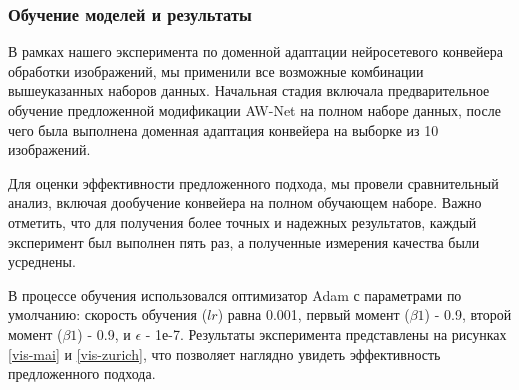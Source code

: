 \subsubsection{Обучение моделей и результаты}\label{sect-2-2-3}

В рамках нашего эксперимента по доменной адаптации нейросетевого конвейера обработки изображений, мы применили все возможные комбинации вышеуказанных наборов данных. Начальная стадия включала предварительное обучение предложенной модификации AW-Net на полном наборе данных, после чего была выполнена доменная адаптация конвейера на выборке из 10 изображений.

Для оценки эффективности предложенного подхода, мы провели сравнительный анализ, включая дообучение конвейера на полном обучающем наборе. Важно отметить, что для получения более точных и надежных результатов, каждый эксперимент был выполнен пять раз, а полученные измерения качества были усреднены.

В процессе обучения использовался оптимизатор Adam с параметрами по умолчанию: скорость обучения ($lr$) равна 0.001, первый момент ($\beta1$) - 0.9, второй момент ($\beta1$) - 0.9, и $\epsilon$ - 1е-7. Результаты эксперимента представлены на рисунках \ref{vis-mai} и \ref{vis-zurich}, что позволяет наглядно увидеть эффективность предложенного подхода.



